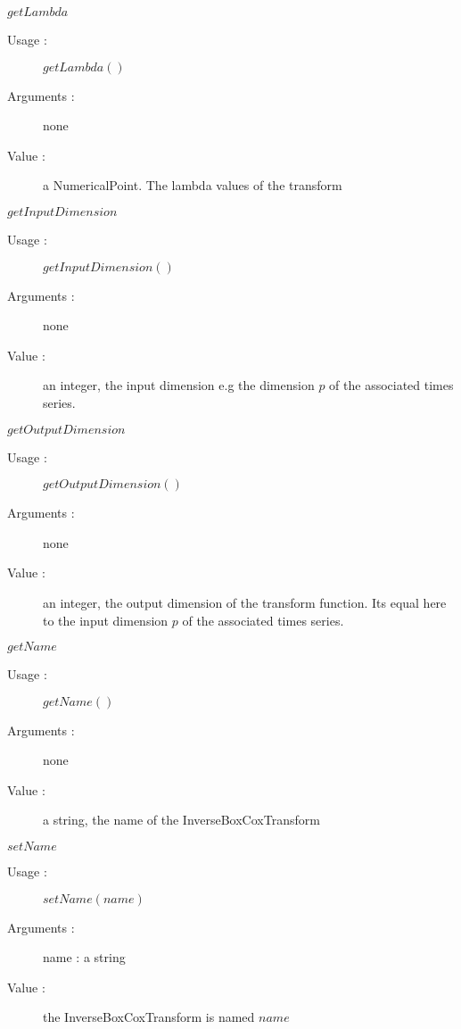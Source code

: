 \begin{description}
\begin{description}
   \item $getLambda$
    \begin{description}
    \item[Usage :] $getLambda()$
    \item[Arguments :] none
    \item[Value :]   a NumericalPoint. The lambda values of the transform
    \end{description}
    \bigskip

   \item $getInputDimension$
    \begin{description}
    \item[Usage :] $getInputDimension()$
    \item[Arguments :] none
    \item[Value :]   an integer, the input dimension e.g the dimension $p$ of the associated times series.
    \end{description}
    \bigskip

   \item $getOutputDimension$
    \begin{description}
    \item[Usage :] $getOutputDimension()$
    \item[Arguments :] none
    \item[Value :]   an integer, the output dimension of the transform function. Its equal here to the input dimension $p$ of the associated times series.
    \end{description}
    \bigskip

 

  \item $getName$
    \begin{description}
    \item[Usage :] $getName()$
    \item[Arguments :] none
    \item[Value :] a string, the name of the InverseBoxCoxTransform
    \end{description}
    \bigskip

  \item $setName$
    \begin{description}
    \item[Usage :] $setName(name)$
    \item[Arguments :] name : a string
    \item[Value :] the InverseBoxCoxTransform is named $name$
    \end{description}
    \bigskip

  \end{description}

\end{description}


